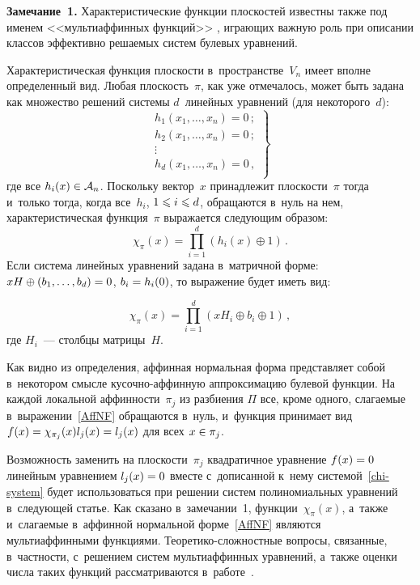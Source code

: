 \begin{multicols}{2}
\smallskip

\noindent
\textbf{Замечание~1.}
  Характеристические функции плоскостей известны также под именем 
<<мультиаффинных функций>> \cite{GT2017}, играющих важную роль при описании 
классов эффективно решаемых систем булевых уравнений.


\smallskip

Характеристическая функция плоскости в~пространстве~$V_n$ имеет вполне 
определенный вид. Любая плоскость~$\pi$, как уже отмечалось, может быть задана 
как множество решений системы $d$~линейных уравнений (для некоторого~$d$):
\begin{equation}
\left.
\begin{array}{c}
        h_1(x_1,\ldots,x_n)=0\,;\\
        h_2(x_1,\ldots,x_n)=0\,;\\
        \vdots\\
        h_d(x_1,\ldots,x_n)=0\,,\\
    \end{array}
    \right\}
    \label{chi-system}
\end{equation}
где все $h_i(x)\hm\in\mathcal{A}_n$. Поскольку вектор~$x$ принадлежит 
плоскости~$\pi$ тогда и~только тогда, когда все~$h_i$, $1\hm\leqslant i\hm\leqslant d$, 
обращаются в~нуль на нем, характеристическая функция~$\pi$ выражается следующим 
образом:
$$
\chi_{\pi}(x)=\prod\limits_{i=1}^d (h_i(x)\oplus 1)\,.
$$
Если система линейных уравнений задана в~мат\-рич\-ной форме: $xH\oplus 
(b_1,\ldots,b_d)\hm=0$, $b_i\hm=h_i(0)$, то выражение будет иметь вид:

\noindent
$$
\chi_{\pi}(x)=\prod\limits_{i=1}^d (xH_i\oplus b_i\oplus 1)\,,
$$
где $H_i$~--- столбцы матрицы~$H$.

Как видно из определения, аффинная нормальная форма представляет собой 
в~некотором смыс\-ле ку\-соч\-но-аф\-фин\-ную аппроксимацию булевой функции. На каждой 
локальной аф\-фин\-ности~$\pi_j$ из разбиения $\Pi$ все, кроме одного, слагаемые 
в~выражении~\eqref{AffNF} обращаются в~нуль, и~функция принимает вид 
$f(x)\hm=\chi_{\pi_j}(x)l_j(x)\hm=l_j(x)$ для всех $x\hm\in\pi_j$.

Возможность заменить на плоскости~$\pi_j$ квадратичное уравнение $f(x)\hm=0$ 
линейным уравнением $l_j(x)\hm=0$ вместе с~дописанной к~нему системой~\eqref{chi-system} 
будет использоваться при решении систем полиномиальных уравнений 
в~следующей статье.
Как сказано в~замечании~1, функции~$\chi_{\pi}(x)$, а~также 
и~слагаемые в~аффинной нормальной форме~\eqref{AffNF} являются мультиаффинными 
функциями. Тео\-ре\-ти\-ко-слож\-ност\-ные вопросы, связанные, в~частности, с~решением 
систем мультиаффинных уравнений, а~также оценки числа таких функций 
рассматриваются в~работе~\cite{Gor1995}.


\end{multicols}
